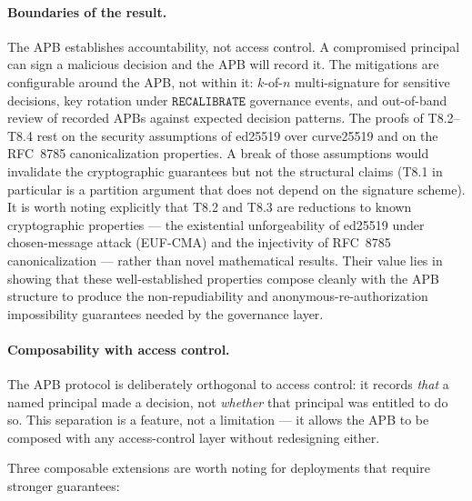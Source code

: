 \documentclass[11pt]{article}
\newcommand{\RECAL}{\texttt{RECALIBRATE}}
\begin{document}
\paragraph{Boundaries of the result.}
The APB establishes accountability, not access control. A
compromised principal can sign a malicious decision and the APB
will record it. The mitigations are configurable around the APB,
not within it: $k$-of-$n$ multi-signature for sensitive decisions,
key rotation under $\RECAL$ governance events, and out-of-band
review of recorded APBs against expected decision patterns.
The proofs of T8.2--T8.4 rest on the security assumptions of
ed25519 over curve25519 and on the RFC~8785 canonicalization
properties. A break of those assumptions would invalidate the
cryptographic guarantees but not the structural claims (T8.1 in
particular is a partition argument that does not depend on the
signature scheme).
It is worth noting explicitly that T8.2 and T8.3 are reductions to
known cryptographic properties --- the existential unforgeability of
ed25519 under chosen-message attack (EUF-CMA) and the injectivity
of RFC~8785 canonicalization --- rather than novel mathematical
results. Their value lies in showing that these well-established
properties compose cleanly with the APB structure to produce the
non-repudiability and anonymous-re-authorization impossibility
guarantees needed by the governance layer.

\paragraph{Composability with access control.}
\label{sec:composability}
The APB protocol is deliberately orthogonal to access control: it
records \emph{that} a named principal made a decision, not
\emph{whether} that principal was entitled to do so. This separation
is a feature, not a limitation --- it allows the APB to be composed
with any access-control layer without redesigning either.

Three composable extensions are worth noting for deployments that
require stronger guarantees:
\end{document}
